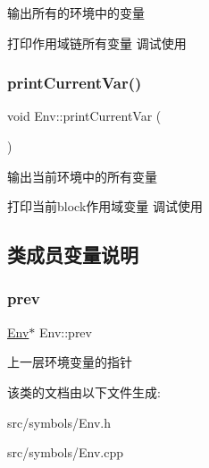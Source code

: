 输出所有的环境中的变量 

打印作用域链所有变量 调试使用 \mbox{\label{class_env_a398c166330482abb7e38c546bc3974cf}} 
\subsubsection{\texorpdfstring{print\+Current\+Var()}{printCurrentVar()}}
{\footnotesize\ttfamily void Env\+::print\+Current\+Var (\begin{DoxyParamCaption}{ }\end{DoxyParamCaption})}



输出当前环境中的所有变量 

打印当前block作用域变量 调试使用 

\subsection{类成员变量说明}
\mbox{\label{class_env_a79a41e9166e949e4c1320ffe3750cb29}} 
\subsubsection{\texorpdfstring{prev}{prev}}
{\footnotesize\ttfamily \hyperlink{class_env}{Env}$\ast$ Env\+::prev\hspace{0.3cm}{\ttfamily [protected]}}

上一层环境变量的指针 

该类的文档由以下文件生成\+:\begin{DoxyCompactItemize}
\item 
src/symbols/Env.\+h\item 
src/symbols/Env.\+cpp\end{DoxyCompactItemize}
